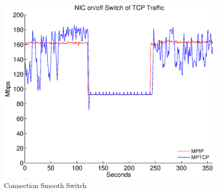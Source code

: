 \begin{figure}
\centering
\includegraphics[width=1\linewidth]{fig/switch.eps}
\caption{Connection Smooth Switch}
\label{fig.switch}
\end{figure}
%
%
